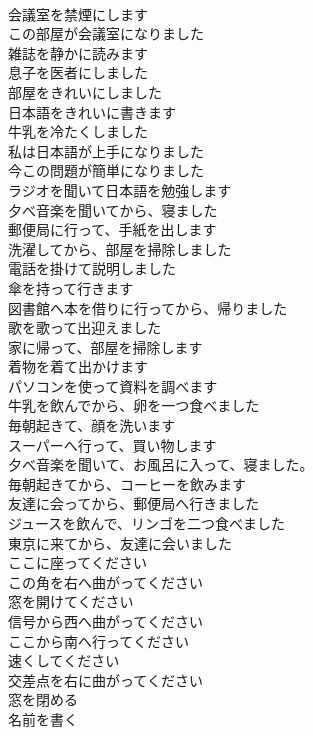 \documentclass[8pt]{extreport}
\begin{document}
\begin{CJK}{UTF8}{min}
\\	会議室を禁煙にします	
\\	この部屋が会議室になりました	
\\	雑誌を静かに読みます	
\\	息子を医者にしました	
\\	部屋をきれいにしました	
\\	日本語をきれいに書きます	
\\	牛乳を冷たくしました	
\\	私は日本語が上手になりました	
\\	今この問題が簡単になりました	
\\	ラジオを聞いて日本語を勉強します	
\\	夕べ音楽を聞いてから、寝ました	
\\	郵便局に行って、手紙を出します	
\\	洗濯してから、部屋を掃除しました	
\\	電話を掛けて説明しました	
\\	傘を持って行きます	
\\	図書館へ本を借りに行ってから、帰りました	
\\	歌を歌って出迎えました	
\\	家に帰って、部屋を掃除します	
\\	着物を着て出かけます	
\\	パソコンを使って資料を調べます	
\\	牛乳を飲んでから、卵を一つ食べました	
\\	毎朝起きて、顔を洗います	
\\	スーパーへ行って、買い物します	
\\	夕べ音楽を聞いて、お風呂に入って、寝ました。	
\\	毎朝起きてから、コーヒーを飲みます	
\\	友達に会ってから、郵便局へ行きました	
\\	ジュースを飲んで、リンゴを二つ食べました	
\\	東京に来てから、友達に会いました	
\\	ここに座ってください	
\\	この角を右へ曲がってください	
\\	窓を開けてください	
\\	信号から西へ曲がってください	
\\	ここから南へ行ってください	
\\	速くしてください	
\\	交差点を右に曲がってください	
\\	窓を閉める	
\\	名前を書く	

\end{CJK}
\end{document}
